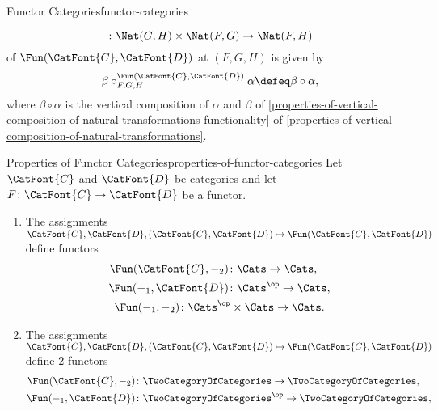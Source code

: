 \begin{definition}{Functor Categories}{functor-categories}
\begin{itemize}
\[                \colon
                \Nat(G,H)
                \times
                \Nat(F,G)
                \to
                \Nat(F,H)
            \]%
            of $\Fun(\CatFont{C},\CatFont{D})$ at $(F,G,H)$ is given by
            \[
                \beta\mathbin{{\circ}^{\Fun(\CatFont{C},\CatFont{D})}_{F,G,H}}\alpha
                \defeq
                \beta\circ\alpha,
            \]%
            where $\beta\circ\alpha$ is the vertical composition of $\alpha$ and $\beta$ of \cref{properties-of-vertical-composition-of-natural-transformations-functionality} of \cref{properties-of-vertical-composition-of-natural-transformations}.
    \end{itemize}
\end{definition}
\begin{proposition}{Properties of Functor Categories}{properties-of-functor-categories}%
    Let $\CatFont{C}$ and $\CatFont{D}$ be categories and let $F\colon\CatFont{C}\to\CatFont{D}$ be a functor.
    \begin{enumerate}
        \item\label{properties-of-functor-categories-functoriality}The assignments $\CatFont{C},\CatFont{D},(\CatFont{C},\CatFont{D})\mapsto\Fun(\CatFont{C},\CatFont{D})$ define functors
            \begin{gather*}
                \begin{aligned}
                    \Fun(\CatFont{C},-_{2})    &\colon                  \Cats \to \Cats,\\
                    \Fun(-_{1},\CatFont{D})    &\colon \Cats^{\op}            \to \Cats,
                \end{aligned}\\
                \Fun(-_{1},-_{2})               \colon \Cats^{\op}\times\Cats \to \Cats.
            \end{gather*}
        \item\label{properties-of-functor-categories-2-functoriality}The assignments $\CatFont{C},\CatFont{D},(\CatFont{C},\CatFont{D})\mapsto\Fun(\CatFont{C},\CatFont{D})$ define 2-functors
            \begin{gather*}
                \begin{aligned}
                    \Fun(\CatFont{C},-_{2})    &\colon                                     \TwoCategoryOfCategories \to \TwoCategoryOfCategories,\\
                    \Fun(-_{1},\CatFont{D})    &\colon \TwoCategoryOfCategories^{\op}                               \to \TwoCategoryOfCategories,

\end{aligned}
\end{gather*}
\end{enumerate}
\end{proposition}
